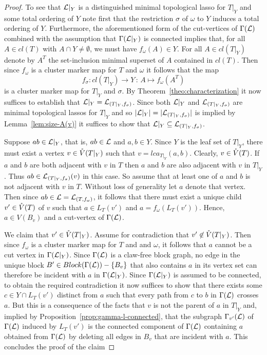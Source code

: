 \begin{proof}
  To see that ${\mathcal L}|_Y$ is a distinguished minimal topological lasso for $T|_Y$
  and some total ordering of $Y$ note first that the restriction $\sigma$ of
  $\omega$ to $Y$ induces a total ordering of $Y$.  Furthermore, the
  aforementioned form of the cut-vertices of $\Gamma({\mathcal L})$ combined with the
  assumption that $\Gamma({\mathcal L}|_Y)$ is connected implies that, for all $A\in
  cl(T)$ with $A\cap Y\not=\emptyset$, we must have $f_{\omega}(A)\in Y$. For
  all $A\in cl(T|_Y)$ denote by $A^T$ the set-inclusion minimal superset of
  $A$ contained in $cl(T)$.  Then since $f_{\omega}$ is a cluster marker map
  for $T$ and $\omega$ it follows that the map
$$
f_{\sigma}:cl(T|_Y)\to Y\,:\, A\mapsto f_{\omega}(A^T)
$$
is a cluster marker map for $T|_Y$ and $\sigma$.  By
Theorem~\ref{theo:characterization} it now suffices to establish that
${\mathcal L}|_Y={\mathcal L}_{(T|_Y,f_{\sigma})}$. Since both ${\mathcal L}|_Y$ and
${\mathcal L}_{(T|_Y,f_{\sigma})}$ are minimal topological lassos for $T|_Y$ and so
$|{\mathcal L}|_Y|=|{\mathcal L}_{(T|_Y,f_{\sigma})}|$ is implied by Lemma~\ref{lem:size-A(v)}
it suffices to show that ${\mathcal L}|_Y\subseteq {\mathcal L}_{(T|_Y,f_{\sigma})}$.

Suppose $ab\in {\mathcal L}|_Y$, that is, $ab\in{\mathcal L}$ and $a,b\in Y$. Since $Y$ is the
leaf set of $T|_Y$, there must exist a vertex $v\in \mathring{V}(T|_Y)$ such that
$v=lca_{T|_Y}(a,b)$. Clearly, $v\in \mathring{V}(T)$. If $a$ and $b$ are both adjacent
with $v$ in $T$ then $a$ and $b$ are also adjacent with $v$ in $T|_Y$. Thus
$ab\in{\mathcal L}_{(T|_Y,f_{\sigma})}(v)$ in this case.  So assume that at least one
of $a$ and $b$ is not adjacent with $v$ in $T$.  Without loss of generality
let $a$ denote that vertex.  Then since $ab\in {\mathcal L}= {\mathcal L}_{(T,f_{\omega})}$, it
follows that there must exist a unique child $v'\in \mathring{V}(T)$ of $v$ such that
$a\in L_T(v')$ and $a=f_{\omega}(L_T(v'))$. Hence, $a\in V(B_v)$ and a
cut-vertex of $\Gamma({\mathcal L})$.

We claim that $v'\in \mathring{V}(T|_Y)$. Assume for contradiction that $v'\not\in
\mathring{V}(T|_Y)$. Then since $f_{\omega}$ is a cluster marker map for $T$ and and
$\omega$, it follows that $a$ cannot be a cut vertex in $\Gamma({\mathcal L}|_Y)$.
Since $\Gamma({\mathcal L})$ is a claw-free block graph, no edge in the unique block
$B'\in Block(\Gamma({\mathcal L}))-\{B_v\}$ that also contains $a$ in its vertex set
can therefore be incident with $a$ in $\Gamma({\mathcal L}|_Y)$. Since $\Gamma({\mathcal L}|_Y)$
is assumed to be connected, to obtain the required contradiction it now
suffices to show that there exists some $c\in Y\cap L_T(v')$ distinct from $a$
such that every path from $c$ to $b$ in $\Gamma({\mathcal L})$ crosses $a$.  But this
is a consequence of the facts that $v$ is not the parent of $a$ in $T|_Y$ and,
implied by Proposition~\ref{prop:gamma-l-connected}, that the subgraph
$\Gamma_{v'}({\mathcal L})$ of $\Gamma({\mathcal L})$ induced by $L_T(v')$ is the connected
component of $\Gamma({\mathcal L})$ containing $a$ obtained from $\Gamma({\mathcal L})$ by
deleting all edges in $B_v$ that are incident with $a$. This concludes the
proof of the claim


\end{proof}
